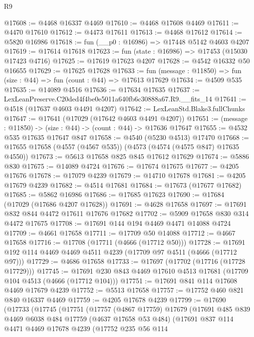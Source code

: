 \begin{lexlean}{R9}
\begin{coremodule}
@17608 := @4468 @16337 @4469
@17610 := @4468 @17608 @4469
@17611 := @4470 @17610
@17612 := @4473 @17611
@17613 := @4468 @17612
@17614 := @5820 @16986
@17618 := fun (__p0 : @16986) => @17448 @5142 @4603 @4207
@17619 := @17614 @17618
@17623 := fun (state : @16986) => @17453 (@15030 @17423 @4716)
@17625 := @17619 @17623 @4207
@17628 := @4542 @16332 @50 @16655
@17629 := @17625 @17628
@17633 := fun (message : @11850) => fun (size : @44) => fun (count : @44) => @17613 @17629
@17634 := @4509 @535
@17635 := @14089 @4516
@17636 := @17634 @17635
@17637 := LexLeanPreserve.C20ded4f4be0e5011a640fb6c30888a67.R9.__fits_14
@17641 := @4518 (@17637 @4603 @4491 @4207)
@17642 := LexLeanStd.Blake3.fullChunks
@17647 := @17641 (@17029 (@17642 @4603 @4491 @4207))
@17651 := (message : @11850) -> (size : @44) -> (count : @44) -> @17636 @17647
@17655 := @4532 @535 @17635 @17647 @847
@17658 := @4540 (@5230 @4513) @17470
@17668 := @17655 @17658 (@4557 (@4567 @535)) (@4573 (@4574 (@4575 @847) @17635 @4550))
@17673 := @5613 @17658 @825 @845 @17612 @17629
@17674 := @5886 @830
@17675 := @14089 @4724
@17676 := @17674 @17675
@17677 := @4205 @17676
@17678 := @17079 @4239
@17679 := @14710 @17678
@17681 := @4205 @17679 @4239
@17682 := @4514 @17681
@17684 := @17673 (@17677 @17682)
@17685 := @5862 @16986
@17686 := @17685 @17623
@17690 := @17684 (@17029 (@17686 @4207 @17628))
@17691 := @4628 @17658
@17697 := @17691 @832 @844 @4472 @17611 @17676 @17682
@17702 := @5909 @17658 @830 @314 @4472 @17675
@17708 := @17691 @144 @194 @4469 @4471 @14088 @4724
@17709 := @4661 @17658
@17711 := @17709 @50 @14088
@17712 := @4667 @17658
@17716 := @17708 (@17711 (@4666 (@17712 @50)))
@17728 := @17691 @192 @114 @4469 @4469 @4511 @4239 (@17709 @97 @4511 (@4666 (@17712 @97)))
@17729 := @4686 @17658
@17733 := @17697 (@17702 (@17716 (@17728 @17729)))
@17745 := @17691 @230 @843 @4469 @17610 @4513 @17681 (@17709 @104 @4513 (@4666 (@17712 @104)))
@17751 := @17691 @841 @114 @17608 @4469 @17679 @4239
@17752 := @5513 @17658
@17757 := @17752 @460 @821 @840 @16337 @4469
@17759 := @4205 @17678 @4239
@17799 := @17690
    (@17733
      (@17745
        (@17751
          (@17757
            (@4867 @17759)
            @17679
            (@17691
              @485
              @839
              @4469
              @6038
              @484
              @17759
              (@4637 @17658 @53 @484)
              (@17691
                @837
                @114
                @4471
                @4469
                @17678
                @4239
                (@17752
                  @235
                  @56
                  @114

\end{coremodule}
\end{lexlean}
